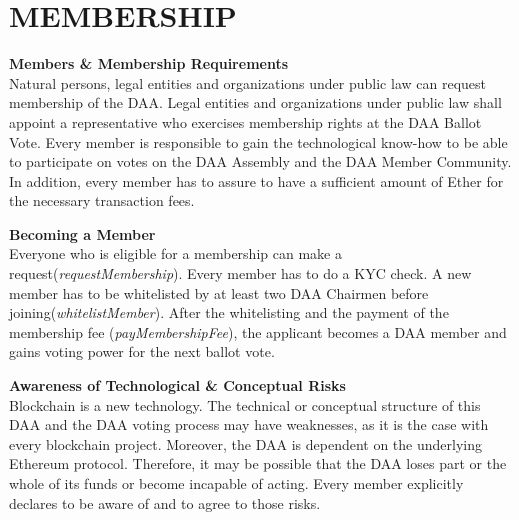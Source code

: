 \section{MEMBERSHIP}\label{sec:membership}

\item \textbf{Members \& Membership Requirements} \\
Natural persons, legal entities and organizations under public law can request membership of the DAA.
Legal entities and organizations under public law shall appoint a representative who exercises membership rights at the DAA Ballot Vote.
Every member is responsible to gain the technological know-how to be able to participate on votes on the DAA Assembly and the DAA Member Community.
In addition, every member has to assure to have a sufficient amount of Ether for the necessary transaction fees.

\item \textbf{Becoming a Member} \\
Everyone who is eligible for a membership can make a request(\emph{requestMembership}).
Every member has to do a KYC check.
A new member has to be whitelisted by at least two DAA Chairmen before joining(\emph{whitelistMember}).
After the whitelisting and the payment of the membership fee (\emph{payMembershipFee}), the applicant becomes a DAA member and gains voting power for the next ballot vote.

\item \textbf{Awareness of Technological \& Conceptual Risks} \\
Blockchain is a new technology.
The technical or conceptual structure of this DAA and the DAA voting process may have weaknesses, as it is the case with every blockchain project.
Moreover, the DAA is dependent on the underlying Ethereum protocol.
Therefore, it may be possible that the DAA loses part or the whole of its funds or become incapable of acting.
Every member explicitly declares to be aware of and to agree to those risks.
